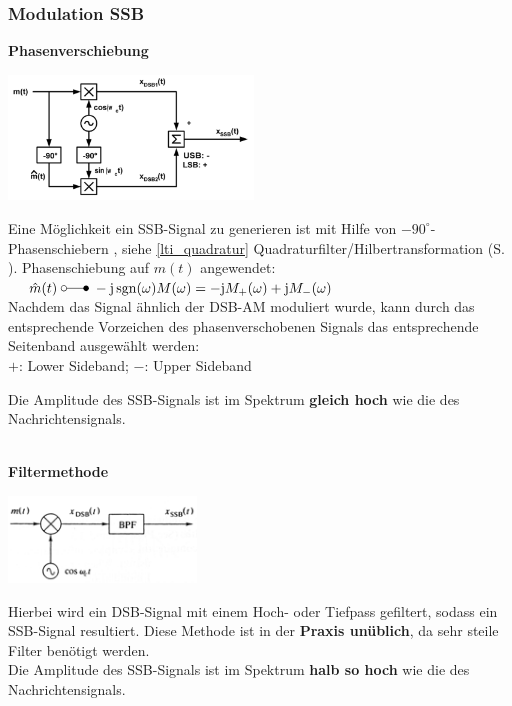 \subsubsection{Modulation SSB }
\textbf{Phasenverschiebung }  \\
\begin{minipage}[t][3.7cm][c]{7.0cm}
    \includegraphics[width=6.5cm]{bilder/am_ssb_modulationPhasenshifter.png}
\end{minipage}
\begin{minipage}[t][3.7cm][c]{11cm}	
	Eine Möglichkeit ein SSB-Signal zu generieren ist mit Hilfe von $ - 90^{\circ} $-Phasenschiebern , {\small siehe
	\ref{lti_quadratur} Quadraturfilter/Hilbertransformation (S. \pageref{lti_quadratur})}.
	Phasenschiebung auf $m(t)$ angewendet: \\
	$\hspace*{0.5cm}\hat{m}(t) \; \laplace \; -\im \sgn(\omega) M(\omega) = -\im M_+(\omega) + \im M_-(\omega)$ \\
	Nachdem das Signal \"ahnlich der DSB-AM moduliert wurde, kann durch das entsprechende Vorzeichen des phasenverschobenen Signals das entsprechende Seitenband ausgewählt werden:\\ 
	$+$: Lower Sideband; \qquad $-$: Upper Sideband
	
	Die Amplitude des SSB-Signals ist im Spektrum \textbf{gleich hoch} wie die des
	Nachrichtensignals.
\end{minipage}\\

\textbf{Filtermethode} \\
\begin{minipage}[t][2cm][c]{5.5cm}
    \includegraphics[width=5cm]{bilder/am_ssb_modulationFilter.png}
\end{minipage}
\begin{minipage}[t][2cm][c]{12.5cm}	
	Hierbei wird ein DSB-Signal mit einem Hoch- oder Tiefpass gefiltert, sodass ein SSB-Signal
	resultiert. Diese Methode ist in der \textbf{Praxis unüblich}, da sehr steile Filter benötigt
	werden.\\
	Die Amplitude des SSB-Signals ist im Spektrum \textbf{halb so hoch} wie die des
	Nachrichtensignals.
\end{minipage}

